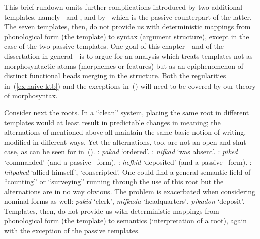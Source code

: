 This brief rundown omits further complications introduced by two additional templates, namely \thit~and \tpie, and by \tpua~which is the passive counterpart of the latter. The seven templates, then, do not provide us with deterministic mappings from phonological form (the template) to syntax (argument structure), except in the case of the two passive templates. One goal of this chapter---and of the dissertation in general---is to argue for an analysis which treats templates not as morphosyntactic atoms (morphemes or features) but as an epiphenomenon of distinct functional heads merging in the structure. Both the regularities in~(\ref{ex:naive-ktb}) and the exceptions in~(\lastx) will need to be covered by our theory of morphosyntax.

Consider next the roots. In a ``clean'' system, placing the same root in different templates would at least result in predictable changes in meaning; the alternations of  mentioned above all maintain the same basic notion of writing, modified in different ways. Yet the alternations, too, are not an open-and-shut case, as can be seen for  in~(\nextx).
\pex\label{ex:naive-pkd}
  \a \tkal: \emph{pakad} `ordered'.
  \a \tnif: \emph{nifkad} `was absent'.
  \a \tpie: \emph{piked} `commanded' (and a passive \tpua~form).
  \a \thif: \emph{hefkid} `deposited' (and a passive \thuf~form).
  \a \thit: \emph{hitpaked} `allied himself', `conscripted'.
\xe
One could find a general semantic field of ``counting'' or ``surveying'' running through the use of this root but the alternations are in no way obvious. The problem is exacerbated when considering nominal forms as well: \emph{pakid} `clerk', \emph{mifkada} `headquarters', \emph{pikadon} `deposit'. Templates, then, do not provide us with deterministic mappings from phonological form (the template) to semantics (interpretation of a root), again with the exception of the passive templates.

